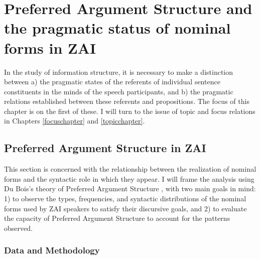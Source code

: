 \chapter{Preferred Argument Structure and the pragmatic status of nominal forms in ZAI}\label{paschapter}

In the study of information structure, it is necessary to make a distinction between a) the pragmatic states of the referents of individual sentence constituents in the minds of the speech participants, and b) the pragmatic relations established between these referents and propositions. The focus of this chapter is on the first of these. I will turn to the issue of topic and focus relations in Chapters \ref{focuschapter} and \ref{topicchapter}.



\section{Preferred Argument Structure in ZAI}\label{pasinzai}

This section is concerned with the relationship between the realization of nominal forms and the syntactic role in which they appear. I will frame the analysis using Du Bois's theory of Preferred Argument Structure \citep{dubois1987,dubois2003,dubois2003a,dubois2003b}, with two main goals in mind: 1) to observe the types, frequencies, and syntactic distributions of the nominal forms used by ZAI speakers to satisfy their discursive goals, and 2) to evaluate the capacity of Preferred Argument Structure to account for the patterns observed.


\subsection{Data and Methodology}\label{data}

